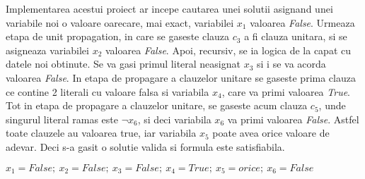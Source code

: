 Implementarea acestui proiect ar incepe cautarea unei solutii asignand unei variabile noi o valoare oarecare, mai exact, variabilei $x_1$ valoarea \textit{False}. Urmeaza etapa de unit propagation, in care se gaseste clauza $c_3$ a fi clauza unitara, si se asigneaza variabilei $x_2$ valoarea \textit{False}.
Apoi, recursiv, se ia logica de la capat cu datele noi obtinute. Se va gasi primul literal neasignat $x_3$ si i se va acorda valoarea \textit{False}. In etapa de propagare a clauzelor unitare se gaseste prima clauza ce contine 2 literali cu valoare falsa si variabila $x_4$, care va primi valoarea \textit{True}. Tot in etapa de propagare a clauzelor unitare, se gaseste acum clauza $c_5$, unde singurul literal ramas este $\neg x_6$, si deci variabila $x_6$ va primi valoarea \textit{False}. Astfel toate clauzele au valoarea true, iar variabila $x_5$ poate avea orice valoare de adevar. Deci s-a gasit o solutie valida si formula este satisfiabila.

$x_1 = False ;~ x_2 = False ;~ x_3 = False ;~ x_4 = True ; ~x_5 = orice ;~ x_6 = False$

